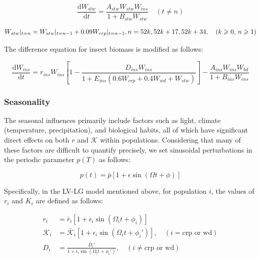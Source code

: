 \documentclass{HZNUMCM}
\begin{document}
          \begin{equation}
          \frac{\mathrm{d}W_{stw}}{\mathrm{d}t} = \frac{A_{stw} W_{stw} W_{ins}}{1 + B_{stw} W_{stw}} \quad (t \neq n)
          \end{equation}
          
          \begin{equation}
          W_{stw}|_{t=n} = W_{stw}|_{t=n-1} + 0.09 W_{crp}|_{t=n-1},\\
          n = 52k, 52k+17, 52k+34, \quad (k \geqslant 0, \, n \geqslant 1)
          \end{equation}
          
          The difference equation for insect biomass is modified as follows:
          
          \begin{equation}
          \frac{\mathrm{d}W_{ins}}{\mathrm{d}t} = r_{ins} W_{ins} \left[ 1 - \frac{D_{ins} W_{ins}}{1 + E_{ins} \left( 0.6 W_{crp} + 0.4 W_{wd} + W_{stw} \right)} \right] - \frac{A_{ins} W_{ins} W_{bd}}{1 + B_{ins} W_{ins}}
          \end{equation}
        
        \subsubsection{Seasonality}
          The seasonal influences primarily include factors such as light, 
          climate (temperature, precipitation), and biological habits, 
          all of which have significant direct effects on both $r$ and $\mathscr{K}$ within populations. 
          Considering that many of these factors are difficult to quantify precisely, 
          we set sinusoidal perturbations in the periodic parameter $p(T)$ as follows:

          \begin{equation}
          p(t) = \bar{p} \left[ 1 + \epsilon \sin (\Omega t + \phi) \right]
          \end{equation}
          
          Specifically, in the LV-LG model mentioned above, 
          for population $i$, the values of $r_i$ and $K_i$ are defined as follows:
          
          \begin{align}
            r_i &= \bar{r}_i \left[ 1 + \epsilon_i \sin \left( \Omega_i t + \phi_i \right) \right] \\
            \mathscr{K}_i &= \bar{\mathscr{K}}_i \left[ 1 + \epsilon_i \sin \left( \Omega_i t + \phi_i' \right) \right], \quad \left( i = \text{crp or wd} \right) \\
            D_i &= \frac{\bar{D}_i'}{1 + \epsilon_i \sin \left( \Omega_i t + \phi_i' \right)}, \quad \left( i \neq \text{crp or wd} \right)
          \end{align}
          
\end{document}
